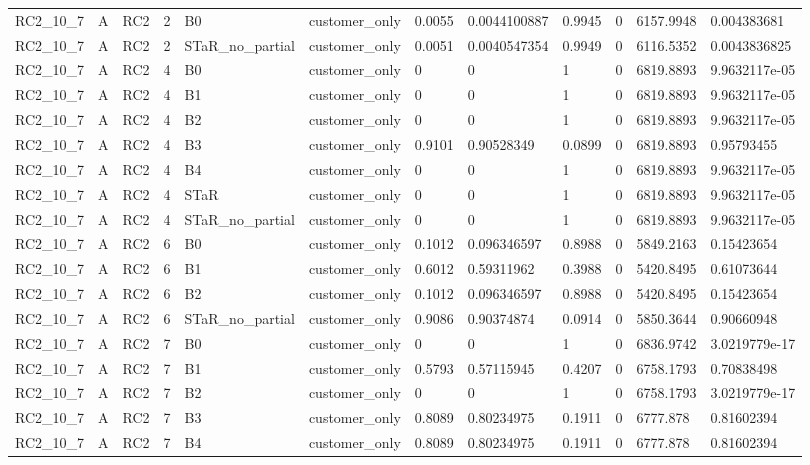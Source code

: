 \begin{longtable}{llllllllllll}
RC2\_10\_7 & A & RC2 & 2 & B0 & customer\_only & 0.0055 & 0.0044100887 & 0.9945 & 0 & 6157.9948 & 0.004383681 \\
RC2\_10\_7 & A & RC2 & 2 & STaR\_no\_partial & customer\_only & 0.0051 & 0.0040547354 & 0.9949 & 0 & 6116.5352 & 0.0043836825 \\
RC2\_10\_7 & A & RC2 & 4 & B0 & customer\_only & 0 & 0 & 1 & 0 & 6819.8893 & 9.9632117e-05 \\
RC2\_10\_7 & A & RC2 & 4 & B1 & customer\_only & 0 & 0 & 1 & 0 & 6819.8893 & 9.9632117e-05 \\
RC2\_10\_7 & A & RC2 & 4 & B2 & customer\_only & 0 & 0 & 1 & 0 & 6819.8893 & 9.9632117e-05 \\
RC2\_10\_7 & A & RC2 & 4 & B3 & customer\_only & 0.9101 & 0.90528349 & 0.0899 & 0 & 6819.8893 & 0.95793455 \\
RC2\_10\_7 & A & RC2 & 4 & B4 & customer\_only & 0 & 0 & 1 & 0 & 6819.8893 & 9.9632117e-05 \\
RC2\_10\_7 & A & RC2 & 4 & STaR & customer\_only & 0 & 0 & 1 & 0 & 6819.8893 & 9.9632117e-05 \\
RC2\_10\_7 & A & RC2 & 4 & STaR\_no\_partial & customer\_only & 0 & 0 & 1 & 0 & 6819.8893 & 9.9632117e-05 \\
RC2\_10\_7 & A & RC2 & 6 & B0 & customer\_only & 0.1012 & 0.096346597 & 0.8988 & 0 & 5849.2163 & 0.15423654 \\
RC2\_10\_7 & A & RC2 & 6 & B1 & customer\_only & 0.6012 & 0.59311962 & 0.3988 & 0 & 5420.8495 & 0.61073644 \\
RC2\_10\_7 & A & RC2 & 6 & B2 & customer\_only & 0.1012 & 0.096346597 & 0.8988 & 0 & 5420.8495 & 0.15423654 \\
RC2\_10\_7 & A & RC2 & 6 & STaR\_no\_partial & customer\_only & 0.9086 & 0.90374874 & 0.0914 & 0 & 5850.3644 & 0.90660948 \\
RC2\_10\_7 & A & RC2 & 7 & B0 & customer\_only & 0 & 0 & 1 & 0 & 6836.9742 & 3.0219779e-17 \\
RC2\_10\_7 & A & RC2 & 7 & B1 & customer\_only & 0.5793 & 0.57115945 & 0.4207 & 0 & 6758.1793 & 0.70838498 \\
RC2\_10\_7 & A & RC2 & 7 & B2 & customer\_only & 0 & 0 & 1 & 0 & 6758.1793 & 3.0219779e-17 \\
RC2\_10\_7 & A & RC2 & 7 & B3 & customer\_only & 0.8089 & 0.80234975 & 0.1911 & 0 & 6777.878 & 0.81602394 \\
RC2\_10\_7 & A & RC2 & 7 & B4 & customer\_only & 0.8089 & 0.80234975 & 0.1911 & 0 & 6777.878 & 0.81602394 \\

\end{longtable}
